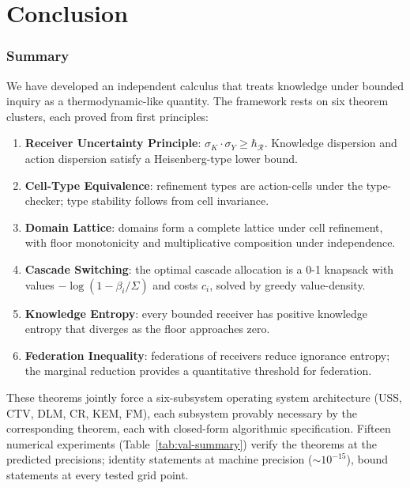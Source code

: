 \documentclass[twocolumn,11pt,a4paper]{article}
\newcommand{\receiver}{\mathcal{R}}
\newcommand{\Sigmax}{\Sigma}
\newcommand{\hbarR}{\hbar_{\receiver}}
\newcommand{\disp}{\sigma}
\begin{document}
\part{Conclusion}

\section{Summary}

We have developed an independent calculus that treats knowledge under bounded inquiry as a thermodynamic-like quantity. The framework rests on six theorem clusters, each proved from first principles:

\begin{enumerate}[nosep,leftmargin=*]
\item \textbf{Receiver Uncertainty Principle}: $\disp_K \cdot \disp_Y \geq \hbarR$. Knowledge dispersion and action dispersion satisfy a Heisenberg-type lower bound.
\item \textbf{Cell-Type Equivalence}: refinement types are action-cells under the type-checker; type stability follows from cell invariance.
\item \textbf{Domain Lattice}: domains form a complete lattice under cell refinement, with floor monotonicity and multiplicative composition under independence.
\item \textbf{Cascade Switching}: the optimal cascade allocation is a 0-1 knapsack with values $-\log(1-\beta_i/\Sigmax)$ and costs $c_i$, solved by greedy value-density.
\item \textbf{Knowledge Entropy}: every bounded receiver has positive knowledge entropy that diverges as the floor approaches zero.
\item \textbf{Federation Inequality}: federations of receivers reduce ignorance entropy; the marginal reduction provides a quantitative threshold for federation.
\end{enumerate}

These theorems jointly force a six-subsystem operating system architecture (USS, CTV, DLM, CR, KEM, FM), each subsystem provably necessary by the corresponding theorem, each with closed-form algorithmic specification. Fifteen numerical experiments (Table~\ref{tab:val-summary}) verify the theorems at the predicted precisions; identity statements at machine precision ($\sim 10^{-15}$), bound statements at every tested grid point.
\end{document}
